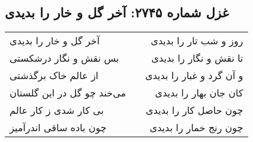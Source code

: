 \begin{center}
\section*{غزل شماره ۲۷۴۵: آخر گل و خار را بدیدی}
\label{sec:2745}
\begin{longtable}{l p{0.5cm} r}
آخر گل و خار را بدیدی
&&
روز و شب تار را بدیدی
\\
بس نقش و نگار درشکستی
&&
تا نقش و نگار را بدیدی
\\
از عالم خاک برگذشتی
&&
و آن گرد و غبار را بدیدی
\\
می‌خند چو گل در این گلستان
&&
کان جان بهار را بدیدی
\\
بی کار شدی ز کار عالم
&&
چون حاصل کار را بدیدی
\\
چون باده ساقی اندرآمیز
&&
چون رنج خمار را بدیدی
\\
\end{longtable}
\end{center}
